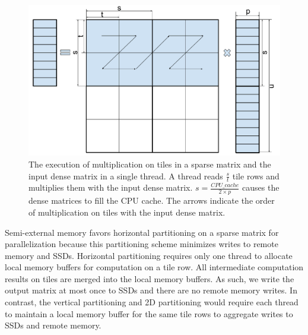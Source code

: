 \begin{figure}
\centering
\includegraphics[scale=0.3]{SpMM_figs/SpMM_exec.pdf}
\caption{The execution of multiplication on tiles in a sparse matrix and
	the input dense matrix in a single thread. A thread reads $\frac{s}{t}$
	tile rows and multiplies them with the input dense matrix.
	$s = \frac{CPU\_cache}{2 \times p}$ causes the dense matrices to fill
	the CPU cache. The arrows indicate the order of multiplication on tiles with the input dense matrix.}
\label{spmm_exec}
\end{figure}

Semi-external memory favors horizontal partitioning on a sparse matrix
for parallelization because this partitioning scheme minimizes writes to
remote memory and SSDs. Horizontal partitioning
requires only one thread to allocate local memory buffers for computation on
a tile row. All intermediate computation results on tiles are merged into
the local memory buffers. As such, we write the output matrix at most once
to SSDs and there are no remote memory writes.
In contrast, the vertical partitioning and 2D partitioning \cite{Koanantakool16}
would require each thread to maintain a local memory buffer for the same tile rows
to aggregate writes to SSDs and remote memory.

